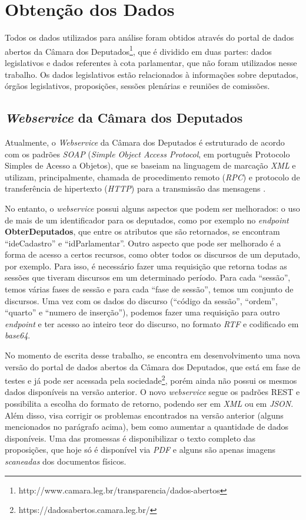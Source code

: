 \section{Obtenção dos Dados}

Todos os dados utilizados para análise foram obtidos através do portal de dados abertos da Câmara dos Deputados\footnote{http://www.camara.leg.br/transparencia/dados-abertos}, que é dividido em duas partes: dados legislativos e dados referentes à cota parlamentar, que não foram utilizados nesse trabalho. Os dados legislativos estão relacionados à informações sobre deputados, órgãos legislativos, proposições, sessões plenárias e reuniões de comissões.

\subsection{\textit{Webservice} da Câmara dos Deputados}

Atualmente, o \textit{Webservice} da Câmara dos Deputados é estruturado de acordo com os padrões \textit{SOAP} (\textit{Simple Object Access Protocol}, em português Protocolo Simples de Acesso a Objetos), que se baseiam na linguagem de marcação \textit{XML} e utilizam, principalmente, chamada de procedimento remoto (\textit{RPC}) e protocolo de transferência de hipertexto (\textit{HTTP}) para a transmissão das mensagens \cite{soap2007}.

No entanto, o \textit{webservice} possui alguns aspectos que podem ser melhorados: o uso de mais de um identificador para os deputados, como por exemplo no \textit{endpoint} \textbf{ObterDeputados}, que entre os atributos que são retornados, se encontram ``ideCadastro'' e ``idParlamentar''. Outro aspecto que pode ser melhorado é a forma de acesso a certos recursos, como obter todos os discursos de um deputado, por exemplo. Para isso, é necessário fazer uma requisição que retorna todas as sessões que tiveram discursos em um determinado período. Para cada ``sessão'', temos várias fases de sessão e para cada ``fase de sessão'', temos um conjunto de discursos. Uma vez com os dados do discurso (``código da sessão'', ``ordem'', ``quarto'' e ``numero de inserção''), podemos fazer uma requisição para outro \textit{endpoint} e ter acesso ao inteiro teor do discurso, no formato \textit{RTF} e codificado em \textit{base64}.

No momento de escrita desse trabalho, se encontra em desenvolvimento uma nova versão do portal de dados abertos da Câmara dos Deputados, que está em fase de testes e já pode ser acessada pela sociedade\footnote{https://dadosabertos.camara.leg.br/}, porém ainda não possui os mesmos dados disponíveis na versão anterior. O novo \textit{webservice} segue os padrões REST e possibilita a escolha do formato de retorno, podendo ser em \textit{XML} ou em  \textit{JSON}. Além disso, visa corrigir os problemas encontrados na versão anterior (alguns mencionados no parágrafo acima), bem como aumentar a quantidade de dados disponíveis. Uma das promessas é disponibilizar o texto completo das proposições, que hoje só é disponível via \textit{PDF} e alguns são apenas imagens \textit{scaneadas} dos documentos físicos.



